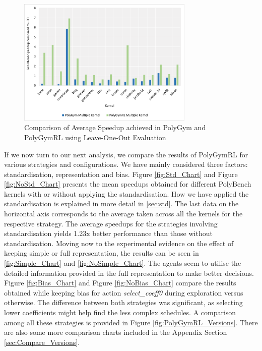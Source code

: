 \documentclass[logo,msc]{infthesis}           %
\begin{document}
\begin{figure}[htbp]
  \centering
  \includegraphics[width=0.75\textwidth]{Images/Chart_Multiple_PolyGym_PolyGymRL.png}    
  \caption{Comparison of Average Speedup achieved in PolyGym and PolyGymRL using Leave-One-Out Evaluation}
  \label{fig:multi_PolyGym_PolyGymRL}
\end{figure}

If we now turn to our next analysis, we compare the results of PolyGymRL for various strategies and configurations. We have mainly considered three factors: standardisation, representation and bias. Figure \ref{fig:Std_Chart} and Figure \ref{fig:NoStd_Chart} presents the mean speedups obtained for different PolyBench kernels with or without applying the standardisation. How we have applied the standardisation is explained in more detail in \ref{sec:std}. The last data on the horizontal axis corresponds to the average taken across all the kernels for the respective strategy. The average speedups for the strategies involving standardisation yields 1.23x better performance than those without standardisation. Moving now to the experimental evidence on the effect of keeping simple or full representation, the results can be seen in \ref{fig:Simple_Chart} and \ref{fig:NoSimple_Chart}. The agents seem to utilise the detailed information provided in the full representation to make better decisions. Figure \ref{fig:Bias_Chart} and Figure \ref{fig:NoBias_Chart} compare the results obtained while keeping bias for action \textit{select\_coeff0} during exploration versus otherwise. The difference between both strategies was significant, as selecting lower coefficients might help find the less complex schedules. A comparison among all these strategies is provided in Figure \ref{fig:PolyGymRL_Versions}. There are also some more comparison charts included in the Appendix Section \ref{sec:Compare_Versions}.
\end{document}
